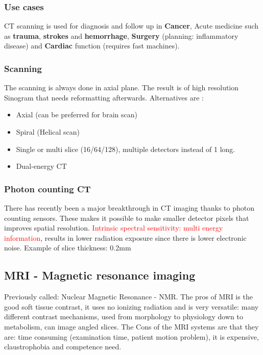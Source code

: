 		\subsubsection*{Use cases}
		CT scanning is used for diagnosis and follow up in \textbf{Cancer}, Acute medicine such as \textbf{trauma}, \textbf{strokes} and \textbf{hemorrhage}, \textbf{Surgery} (planning: inflammatory disease) and \textbf{Cardiac} function (requires fast machines).

		\subsubsection*{Scanning}
		The scanning is always done in axial plane. The result is of high resolution Sinogram that needs reformatting afterwards. Alternatives are :
			\begin{itemize}
		 		\item Axial (can be preferred for brain scan)
		 		\item Spiral (Helical scan)
		 		\item Single or multi slice (16/64/128), multiple detectors instead of 1 long.
		 		\item Dual-energy CT
		 	\end{itemize} 		
		
		\subsubsection*{Photon counting CT}
		There has recently been a major breakthrough in CT imaging thanks to photon counting sensors. These makes it possible to make smaller detector pixels that improves spatial resolution. \textcolor{red}{Intrinsic spectral sensitivity: multi energy information}, results in lower radiation exposure since there is lower electronic noise. Example of slice thickness: 0.2mm

	\subsection*{MRI - Magnetic resonance imaging}
	Previously called: Nuclear Magnetic Resonance - NMR. The pros of MRI is the good soft tissue contrast, it uses no ionizing radiation and is very versatile: many different contrast mechanisms, used from morphology to physiology down to metabolism, can image angled slices. The Cons of the MRI systems are that they are: time consuming (examination time, patient motion problem), it is expensive, claustrophobia and competence need. 

